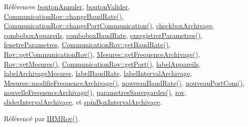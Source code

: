 Références \hyperlink{class_i_h_m_rov_a4a6fec1b4a86c93c1d0d62d66804db5c}{bouton\+Annuler}, \hyperlink{class_i_h_m_rov_a4294b6c808089083906fb0815d1c9c27}{bouton\+Valider}, \hyperlink{class_communication_rov_ac49ffc6f2e6ae22ea9f99e10ca0a4163}{Communication\+Rov\+::change\+Baud\+Rate()}, \hyperlink{class_communication_rov_ad46397a58ba7704fbd5ac5748e083004}{Communication\+Rov\+::change\+Port\+Communication()}, \hyperlink{class_i_h_m_rov_a85be76b5fee7281642db582a79a53511}{checkbox\+Archivage}, \hyperlink{class_i_h_m_rov_a12b970f1d2a170f14a01a684787904a5}{combobox\+Appareils}, \hyperlink{class_i_h_m_rov_a542c0cf87de612cd529b0753b60e4f95}{combobox\+Baud\+Rate}, \hyperlink{class_i_h_m_rov_a94d31f4e748f3e4549eab42c8bc7e367}{enregistrer\+Parametres()}, \hyperlink{class_i_h_m_rov_a277956dfb79e5345e5ae0117fe41ddf2}{fenetre\+Parametres}, \hyperlink{class_communication_rov_a810de691dfc6d305f77c92ccd90bb6db}{Communication\+Rov\+::get\+Baud\+Rate()}, \hyperlink{class_rov_ad30543625f584e28bf785a80c59506dc}{Rov\+::get\+Communication\+Rov()}, \hyperlink{class_mesures_ae969e38402b8d19fe9b484f368200578}{Mesures\+::get\+Frequence\+Archivage()}, \hyperlink{class_rov_a0edd5f7db785bd856b8723fe49ca7848}{Rov\+::get\+Mesures()}, \hyperlink{class_communication_rov_a6226f9338fffc648cfca91c8e585a26b}{Communication\+Rov\+::get\+Port()}, \hyperlink{class_i_h_m_rov_ac6f93c34da2a4e24f743e61fd5d62405}{label\+Appareils}, \hyperlink{class_i_h_m_rov_a58e157352986f690bca4b79b9b05ee1d}{label\+Archivage\+Mesures}, \hyperlink{class_i_h_m_rov_a6e9a97a5cd38bfd92e6114c4299be7ee}{label\+Baud\+Rate}, \hyperlink{class_i_h_m_rov_a42fb93c9764bfc2fe81ba65fc02d8de2}{label\+Interval\+Archivage}, \hyperlink{class_mesures_ac1d2ea97f648264ebd690fba8f7020cc}{Mesures\+::modifie\+Frequence\+Archivage()}, \hyperlink{class_i_h_m_rov_a051d1d8d545e97c6b838df9054dddc6f}{nouveau\+Baud\+Rate()}, \hyperlink{class_i_h_m_rov_ae64280b18ebe069c1f64bd5f19ef3a2e}{nouveau\+Port\+Com()}, \hyperlink{class_i_h_m_rov_afcfb7f60c126fbaa87cb3f501189cc39}{nouvelle\+Frequence\+Archivage()}, \hyperlink{class_i_h_m_rov_accf04daf204c5810c8a6099bb7e37b7e}{parametres\+Sauvegardes()}, \hyperlink{class_i_h_m_rov_a777ca33fdb295ba6b6773e880356fa1e}{rov}, \hyperlink{class_i_h_m_rov_a8c55c93ee14ee51335e72af07b521312}{slider\+Interval\+Archivage}, et \hyperlink{class_i_h_m_rov_abc906e8e992ecdf5eb1dae5dc622b768}{spin\+Box\+Interval\+Archivage}.



Référencé par \hyperlink{class_i_h_m_rov_a5dac1fb4612866cc61f699a415e0ef6b}{I\+H\+M\+Rov()}.


